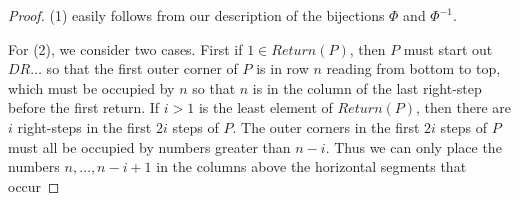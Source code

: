 \documentclass[
final,nomarks
]{dmtcs-episciences}
\begin{document}
\begin{proof}
	
	(1) easily follows from our description of the bijections \begin{math}\Phi\end{math} and \begin{math}\Phi^{-1}\end{math}. 
	
	For (2), we consider two cases.  First if \begin{math}1 \in Return(P)\end{math}, then \begin{math}P\end{math} must start 
	out \begin{math}DR \ldots \end{math} so that the first outer corner of \begin{math}P\end{math} is in row \begin{math}n\end{math} reading 
	from bottom to top, which must be occupied by \begin{math}n\end{math} so that \begin{math}n\end{math} is 
	in the column of the last right-step before the first return. If 
	\begin{math}i > 1\end{math} is the least element of \begin{math}Return(P)\end{math}, then there are \begin{math}i\end{math} right-steps in 
	the first \begin{math}2i\end{math} steps of \begin{math}P\end{math}.  The outer corners in the first \begin{math}2i\end{math} steps 
	of \begin{math}P\end{math} must all be occupied by numbers greater than \begin{math}n-i\end{math}.  Thus we can only place the 
	numbers \begin{math}n, \ldots ,n-i+1\end{math} in the columns above the horizontal segments that occur 

\end{proof}
\end{document}
